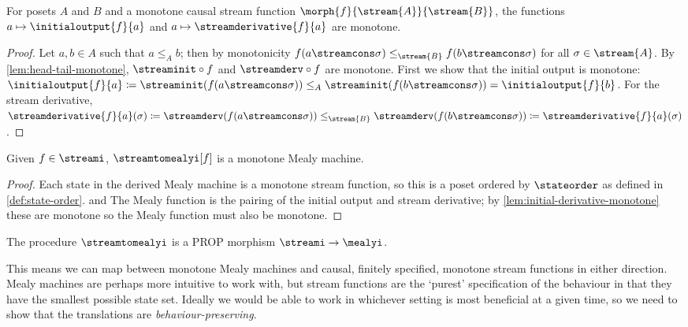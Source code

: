 \begin{lemma}\label{lem:initial-derivative-monotone}
    For posets \(A\) and \(B\) and a monotone causal stream function
    \(\morph{f}{\stream{A}}{\stream{B}}\), the functions
    \(a \mapsto \initialoutput{f}{a}\) and \(a \mapsto \streamderivative{f}{a}\)
    are monotone.
\end{lemma}
\begin{proof}
    Let \(a, b \in A\) such that \(a \leq_A b\); then by monotonicity
    \(f(a \streamcons \sigma) \leq_{\stream{B}} f(b \streamcons \sigma)\) for
    all \(\sigma \in \stream{A}\).
    By \cref{lem:head-tail-monotone}, \(\streaminit \circ f\) and
    \(\streamderv \circ f\) are monotone.
    First we show that the initial output is monotone: \(
    \initialoutput{f}{a} \coloneqq
    \streaminit(f(a \streamcons \sigma)) \leq_{A}
    \streaminit(f(b \streamcons \sigma)) =
    \initialoutput{f}{b}
    \).
    For the stream derivative, \(
    \streamderivative{f}{a}(\sigma) \coloneqq
    \streamderv(f(a \streamcons \sigma)) \leq_{\stream{B}}
    \streamderv(f(b \streamcons \sigma)) \coloneqq
    \streamderivative{f}{a}(\sigma)
    \).
\end{proof}

\begin{lemma}\label{lem:stream-to-mealy-is-monotone}
    Given \(f \in \streami\), \(\streamtomealyi[f]\) is
    a monotone Mealy machine.
\end{lemma}
\begin{proof}
    Each state in the derived Mealy machine is a monotone stream function, so
    this is a poset ordered by \(\stateorder\) as defined in
    \cref{def:state-order}. and
    The Mealy function is the pairing of the initial output and stream
    derivative; by \cref{lem:initial-derivative-monotone} these are monotone so
    the Mealy function must also be monotone.
\end{proof}

\begin{corollary}
    The procedure \(\streamtomealyi\) is a PROP morphism
    \(\streami \to \mealyi\).
\end{corollary}

This means we can map between monotone Mealy machines and causal, finitely
specified, monotone stream functions in either direction.
Mealy machines are perhaps more intuitive to work with, but stream functions
are the `purest' specification of the behaviour in that they have the smallest
possible state set.
Ideally we would be able to work in whichever setting is most beneficial at a
given time, so we need to show that the translations are
\emph{behaviour-preserving}.

